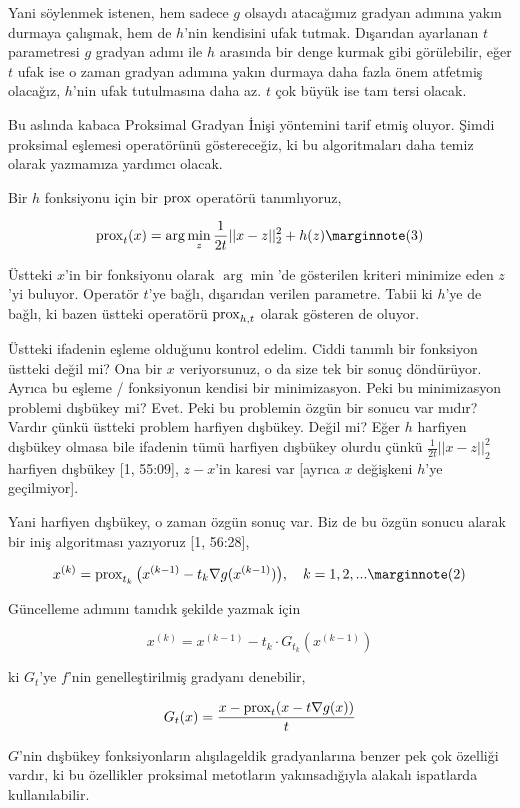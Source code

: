 \documentclass[12pt,fleqn]{article}\usepackage{../../common}
\begin{document}
Yani söylenmek istenen, hem sadece $g$ olsaydı atacağımız gradyan adımına
yakın durmaya çalışmak, hem de $h$'nin kendisini ufak tutmak. Dışarıdan
ayarlanan $t$ parametresi $g$ gradyan adımı ile $h$ arasında bir denge
kurmak gibi görülebilir, eğer $t$ ufak ise o zaman gradyan adımına yakın
durmaya daha fazla önem atfetmiş olacağız, $h$'nin ufak tutulmasına daha
az. $t$ çok büyük ise tam tersi olacak. 

Bu aslında kabaca Proksimal Gradyan İnişi yöntemini tarif etmiş
oluyor. Şimdi proksimal eşlemesi operatörünü göstereceğiz, ki bu
algoritmaları daha temiz olarak yazmamıza yardımcı olacak. 

Bir $h$ fonksiyonu için bir $\operatorname{prox}$ operatörü tanımlıyoruz, 

$$
\prox_{t} (x) = \arg\min_z \frac{1}{2t} ||x-z||_2^2 + h(z)
\mlabel{3}
$$

Üstteki $x$'in bir fonksiyonu olarak $\arg\min$'de gösterilen kriteri
minimize eden $z$'yi buluyor. Operatör $t$'ye bağlı, dışarıdan verilen
parametre. Tabii ki $h$'ye de bağlı, ki bazen üstteki operatörü
$\operatorname{prox}_{h,t}$ olarak gösteren de oluyor.

Üstteki ifadenin eşleme olduğunu kontrol edelim. Ciddi tanımlı bir
fonksiyon üstteki değil mi? Ona bir $x$ veriyorsunuz, o da size tek bir
sonuç döndürüyor. Ayrıca bu eşleme / fonksiyonun kendisi bir
minimizasyon. Peki bu minimizasyon problemi dışbükey mi? Evet. Peki bu
problemin özgün bir sonucu var mıdır? Vardır çünkü üstteki problem harfiyen
dışbükey. Değil mi? Eğer $h$ harfiyen dışbükey olmasa bile ifadenin tümü
harfiyen dışbükey olurdu çünkü $\frac{1}{2t} ||x-z||_2^2$ harfiyen
dışbükey [1, 55:09], $z-x$'in karesi var [ayrıca $x$ değişkeni $h$'ye
geçilmiyor].

Yani harfiyen dışbükey, o zaman özgün sonuç var. Biz de bu özgün sonucu
alarak bir iniş algoritması yazıyoruz [1, 56:28], 

$$
x^{(k)} = \prox_{t_k} \big( 
x^{(k-1)} - t_k \nabla g(x^{(k-1)})
\big), \quad k=1,2,...
\mlabel{2}
$$

Güncelleme adımını tanıdık şekilde yazmak için 

$$
x^{(k)} = x^{(k-1)} - t_k \cdot G_{t_k} (x^{(k-1)})
$$

ki $G_t$'ye $f$'nin genelleştirilmiş gradyanı denebilir,

$$
G_t(x) = \frac{x - \operatorname{prox}_{t}(x - t \nabla g(x))}{t}
$$

$G$'nin dışbükey fonksiyonların alışılageldik gradyanlarına benzer pek çok
özelliği vardır, ki bu özellikler proksimal metotların yakınsadığıyla
alakalı ispatlarda kullanılabilir.
\end{document}

